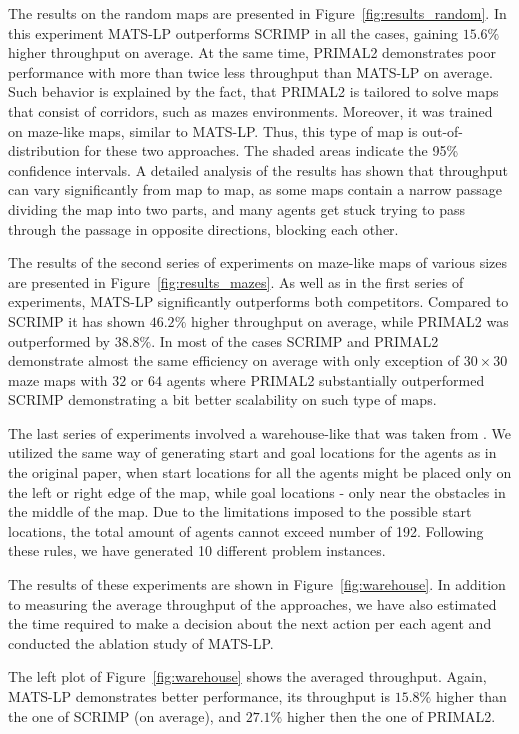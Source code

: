 \documentclass[letterpaper]{article} %
\begin{document}
The results on the random maps are presented in Figure~\ref{fig:results_random}.
In this experiment MATS-LP outperforms SCRIMP in all the cases, gaining $15.6\%$ higher throughput on average. At the same time, PRIMAL2 demonstrates poor performance with more than twice less throughput than MATS-LP on average. Such behavior is explained by the fact, that PRIMAL2 is tailored to solve maps that consist of corridors, such as mazes environments. Moreover, it was trained on maze-like maps, similar to MATS-LP. Thus, this type of map is out-of-distribution for these two approaches.
The shaded areas indicate the 95\% confidence intervals. A detailed analysis of the results has shown that throughput can vary significantly from map to map, as some maps contain a narrow passage dividing the map into two parts, and many agents get stuck trying to pass through the passage in opposite directions, blocking each other.




The results of the second series of experiments on maze-like maps of various sizes are presented in Figure~\ref{fig:results_mazes}. As well as in the first series of experiments, MATS-LP significantly outperforms both competitors. Compared to SCRIMP it has shown $46.2\%$ higher throughput on average, while PRIMAL2 was outperformed by $38.8\%$.
In most of the cases SCRIMP and PRIMAL2 demonstrate almost the same efficiency on average with only exception of $30\times30$ maze maps with $32$ or $64$ agents where PRIMAL2 substantially outperformed SCRIMP demonstrating a bit better scalability on such type of maps.


The last series of experiments involved a warehouse-like that was taken from \cite{li2021lifelong}. We utilized the same way of generating start and goal locations for the agents as in the original paper, when start locations for all the agents might be placed only on the left or right edge of the map, while goal locations - only near the obstacles in the middle of the map. Due to the limitations imposed to the possible start locations, the total amount of agents cannot exceed number of 192. Following these rules, we have generated 10 different problem instances.

The results of these experiments are shown in Figure~\ref{fig:warehouse}. In addition to measuring the average throughput of the approaches, we have also estimated the time required to make a decision about the next action per each agent and conducted the ablation study of MATS-LP.

The left plot of Figure~\ref{fig:warehouse} shows the averaged throughput. Again, MATS-LP demonstrates better performance, its throughput is $15.8\%$ higher than the one of SCRIMP (on average), and $27.1\%$ higher then the one of PRIMAL2.
\end{document}
